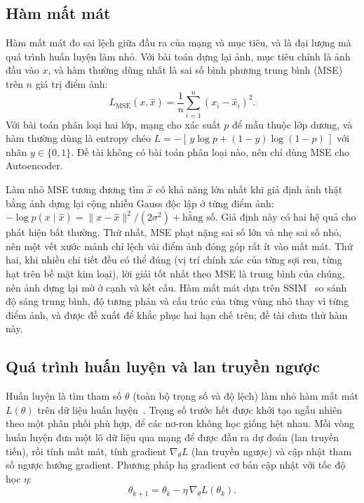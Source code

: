 \subsection{Hàm mất mát}

Hàm mất mát đo sai lệch giữa đầu ra của mạng và mục tiêu, và là đại lượng mà quá trình huấn luyện làm nhỏ. Với bài
toán dựng lại ảnh, mục tiêu chính là ảnh đầu vào $x$, và hàm thường dùng nhất là sai số bình phương trung bình (MSE)
trên $n$ giá trị điểm ảnh:
\begin{equation}
  L_{\text{MSE}}(x, \hat{x}) = \frac{1}{n}\sum_{i=1}^{n} (x_i - \hat{x}_i)^2 .
  \label{eq:mse}
\end{equation}
Với bài toán phân loại hai lớp, mạng cho xác suất $p$ để mẫu thuộc lớp dương, và hàm thường dùng là entropy chéo
$L = -[\,y \log p + (1-y)\log(1-p)\,]$ với nhãn $y \in \{0, 1\}$. Đề tài không có bài toán phân loại nào, nên chỉ dùng
MSE cho Autoencoder.

Làm nhỏ MSE tương đương tìm $\hat{x}$ có khả năng lớn nhất khi giả định ảnh thật bằng ảnh dựng lại cộng nhiễu Gauss
độc lập ở từng điểm ảnh: $-\log p(x \mid \hat{x}) = \lVert x - \hat{x}\rVert^2 / (2\sigma^2) + \text{hằng số}$. Giả
định này có hai hệ quả cho phát hiện bất thường. Thứ nhất, MSE phạt nặng sai số lớn và nhẹ sai số nhỏ, nên một vết
xước mảnh chỉ lệch vài điểm ảnh đóng góp rất ít vào mất mát. Thứ hai, khi nhiều chi tiết đều có thể đúng (vị trí
chính xác của từng sợi ren, từng hạt trên bề mặt kim loại), lời giải tốt nhất theo MSE là trung bình của chúng, nên ảnh
dựng lại mờ ở cạnh và kết cấu. Hàm mất mát dựa trên SSIM~\cite{bergmannImprovingUnsupervisedDefect2019} so sánh độ
sáng trung bình, độ tương phản và cấu trúc của từng vùng nhỏ thay vì từng điểm ảnh, và được đề xuất để khắc phục hai
hạn chế trên; đề tài chưa thử hàm này.

\subsection{Quá trình huấn luyện và lan truyền ngược}

Huấn luyện là tìm tham số $\theta$ (toàn bộ trọng số và độ lệch) làm nhỏ hàm mất mát $L(\theta)$ trên dữ liệu
huấn luyện~\cite{pytorchOptimizingModelParameters}. Trọng số trước hết được khởi tạo ngẫu nhiên theo một phân phối
phù hợp, để các nơ-ron không học giống hệt nhau. Mỗi vòng huấn luyện đưa một lô dữ liệu qua mạng để được đầu ra dự
đoán (lan truyền tiến), rồi tính mất mát, tính gradient $\nabla_\theta L$ (lan truyền ngược) và cập nhật tham số
ngược hướng gradient. Phương pháp hạ gradient cơ bản cập nhật với tốc độ học $\eta$:
\begin{equation}
  \theta_{k+1} = \theta_k - \eta\, \nabla_\theta L(\theta_k) .
  \label{eq:gd}
\end{equation}

